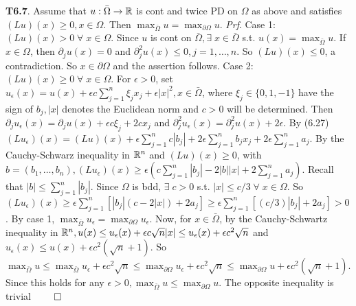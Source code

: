 {\bf T6.7}. Assume that $u: \bar{\Omega} \rightarrow \mathbb{R}$ is cont and twice PD on $\Omega$ as above and satisfies $(Lu)(x) \geq 0, x \in \Omega$. Then $\max_{\bar{\Omega}} u = \max_{\partial \Omega} u$. {\it Prf}. Case 1: $(Lu)(x) > 0\; \forall \; x \in \Omega$. Since $u$ is cont on $\bar{\Omega}, \exists \; x \in \bar{\Omega}$ s.t. $u(x) = \max_{\bar{\Omega}} u$. If $x \in \Omega$, then $\partial_j u(x) = 0$ and $\partial_j^2 u(x) \leq 0, j = 1, \dots, n$. So $(Lu)(x) \leq 0$, a contradiction. So $x \in \partial \Omega$ and the assertion follows. Case 2: $(Lu)(x) \geq 0\; \forall \; x \in \Omega$. For $\epsilon > 0$, set $u_{\epsilon} (x) = u(x) + \epsilon c \sum_{j=1}^n \xi_j x_j + \epsilon |x|^2, x \in \bar{\Omega}$, where $\xi_j \in \{0, 1, -1\}$ have the sign of $b_j, |x|$ denotes the Euclidean norm and $c > 0$ will be determined.  Then $\partial_j u_{\epsilon}(x) = \partial_j u(x) + \epsilon c \xi_j + 2 c x_j$ and $\partial_j^2 u_{\epsilon}(x) = \partial_j^2 u(x) + 2 \epsilon$. By (6.27) $(Lu_{\epsilon})(x) = (Lu)(x) + \epsilon \sum_{j=1}^n c|b_j| + 2 \epsilon \sum_{j=1}^n b_j x_j + 2 \epsilon \sum_{j=1}^n a_j$. By the Cauchy-Schwarz inequality in $\mathbb{R}^n$ and $(Lu)(x) \geq 0$, with $b = (b_1, \dots, b_n), (Lu_{\epsilon})(x) \geq \epsilon(c \sum_{j=1}^n|b_j|-2|b||x| + 2 \sum_{j=1}^n a_j)$. Recall that $|b| \leq \sum_{j=1}^n|b_j|$. Since $\Omega$ is bdd, $\exists \; c > 0$ s.t. $|x| \leq c/3 \; \forall \; x \in \Omega$. So $(Lu_{\epsilon})(x) \geq \epsilon \sum_{j=1}^n[|b_j|(c-2|x|) + 2 a_j] \geq \epsilon \sum_{j=1}^n[(c/3)|b_j| + 2 a_j] >0$. By case 1, $\max_{\bar{\Omega}} u_{\epsilon} = \max_{\partial \Omega} u_{\epsilon}$. Now, for $x \in \bar{\Omega}$, by the Cauchy-Schwartz inequality in $\mathbb{R}^n, u(x) \leq u_{\epsilon}(x) + \epsilon c \sqrt{n} |x| \leq u_{\epsilon}(x) + \epsilon c^2 \sqrt{n}$ and $u_{\epsilon}(x) \leq u(x) + \epsilon c^2(\sqrt{n}+1)$. So $\max_{\bar{\Omega}} u \leq \max_{\bar{\Omega}} u_{\epsilon} + \epsilon c^2 \sqrt{n} \leq \max_{\partial \Omega} u_{\epsilon} + \epsilon c^2 \sqrt{n} \leq \max_{\partial \Omega} u + \epsilon c^2(\sqrt{n}+1)$. Since this holds for any $\epsilon > 0, \max_{\bar{\Omega}}u \leq \max_{\partial \Omega} u$. The opposite inequality is trivial $\qed$
